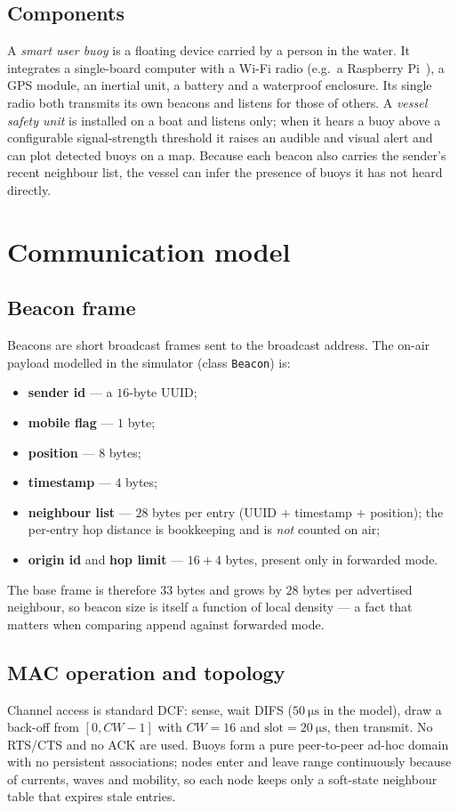 \documentclass[12pt,a4paper,oneside]{report}
\begin{document}
\subsection{Components}
A \emph{smart user buoy} is a floating device carried by a person in the water.
It integrates a single-board computer with a Wi-Fi radio (e.g.\ a Raspberry
Pi~\cite{raspberrypi}), a GPS module, an inertial unit, a battery and a
waterproof enclosure. Its single radio both transmits its own beacons and
listens for those of others. A \emph{vessel safety unit} is installed on a boat
and listens only; when it hears a buoy above a configurable signal-strength
threshold it raises an audible and visual alert and can plot detected buoys on a
map. Because each beacon also carries the sender's recent neighbour list, the
vessel can infer the presence of buoys it has not heard directly.

\section{Communication model}
\subsection{Beacon frame}
Beacons are short broadcast frames sent to the broadcast address. The on-air
payload modelled in the simulator (class \texttt{Beacon}) is:
\begin{itemize}[leftmargin=1.4em,nosep]
  \item \textbf{sender id} --- a $16$-byte UUID;
  \item \textbf{mobile flag} --- $1$ byte;
  \item \textbf{position} --- $8$ bytes;
  \item \textbf{timestamp} --- $4$ bytes;
  \item \textbf{neighbour list} --- $28$ bytes per entry (UUID $+$ timestamp $+$
  position); the per-entry hop distance is bookkeeping and is \emph{not} counted
  on air;
  \item \textbf{origin id} and \textbf{hop limit} --- $16+4$ bytes, present only
  in forwarded mode.
\end{itemize}
The base frame is therefore $33$ bytes and grows by $28$ bytes per advertised
neighbour, so beacon size is itself a function of local density --- a fact that
matters when comparing append against forwarded mode.

\subsection{MAC operation and topology}
Channel access is standard DCF: sense, wait DIFS ($\SI{50}{\micro\second}$ in
the model), draw a back-off from $[0,CW-1]$ with $CW=16$ and
$\text{slot}=\SI{20}{\micro\second}$, then transmit. No RTS/CTS and no ACK are
used. Buoys form a pure peer-to-peer ad-hoc domain with no persistent
associations; nodes enter and leave range continuously because of currents,
waves and mobility, so each node keeps only a soft-state neighbour table that
expires stale entries.
\end{document}
